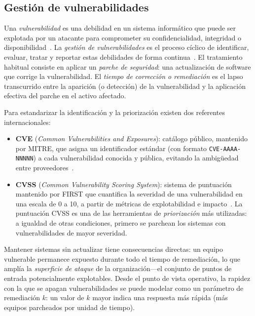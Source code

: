 \documentclass[11pt,a4paper]{article}
\begin{document}
\subsection{Gestión de vulnerabilidades}
\label{sec:marco-gestion}

Una \emph{vulnerabilidad} es una debilidad en un sistema informático que puede
ser explotada por un atacante para comprometer su confidencialidad,
integridad o disponibilidad~\cite{nistvuln}. La \emph{gestión de
vulnerabilidades} es el proceso cíclico de identificar, evaluar, tratar y
reportar estas debilidades de forma continua~\cite{nist80040}. El tratamiento
habitual consiste en aplicar un \emph{parche de seguridad}: una actualización
de software que corrige la vulnerabilidad. El \emph{tiempo de corrección o
remediación} es el lapso transcurrido entre la aparición (o detección) de la
vulnerabilidad y la aplicación efectiva del parche en el activo afectado.

Para estandarizar la identificación y la priorización existen dos referentes
internacionales:

\begin{itemize}
  \item \textbf{CVE} (\emph{Common Vulnerabilities and Exposures}): catálogo
        público, mantenido por MITRE, que asigna un identificador estándar
        (con formato \texttt{CVE-AAAA-NNNNN}) a cada vulnerabilidad conocida
        y pública, evitando la ambigüedad entre proveedores~\cite{cve}.
  \item \textbf{CVSS} (\emph{Common Vulnerability Scoring System}): sistema
        de puntuación mantenido por FIRST que cuantifica la severidad de una
        vulnerabilidad en una escala de 0 a 10, a partir de métricas de
        explotabilidad e impacto~\cite{cvss}. La puntuación CVSS es una de
        las herramientas de \emph{priorización} más utilizadas: a igualdad de
        otras condiciones, primero se parchean los sistemas con vulnerabilidades
        de mayor severidad.
\end{itemize}

Mantener sistemas sin actualizar tiene consecuencias directas: un equipo
vulnerable permanece expuesto durante todo el tiempo de remediación, lo que
amplía la \emph{superficie de ataque} de la organización---el conjunto de
puntos de entrada potencialmente explotables. Desde el punto de vista
operativo, la rapidez con la que se apagan vulnerabilidades se puede modelar
como un parámetro de remediación $k$: un valor de $k$ mayor indica una
respuesta más rápida (más equipos parcheados por unidad de tiempo).
\end{document}
